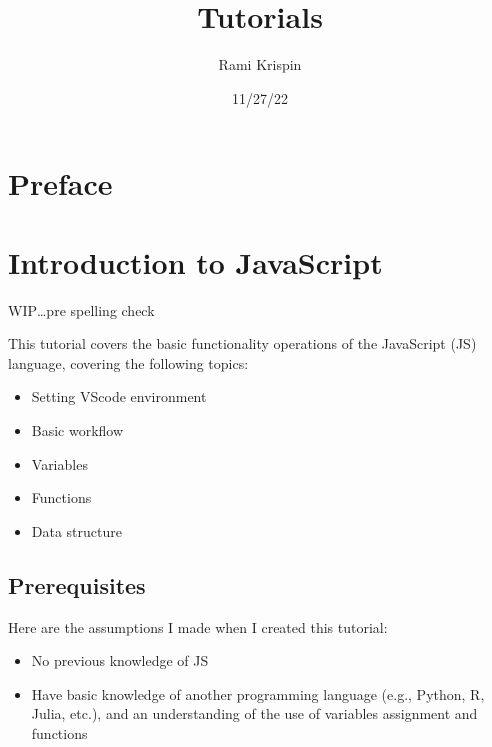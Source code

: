 \documentclass[
  letterpaper,
  DIV=11,
  numbers=noendperiod]{scrreprt}
\title{Tutorials}
\author{Rami Krispin}
\date{11/27/22}
\providecommand{\tightlist}{%
  \setlength{\itemsep}{0pt}\setlength{\parskip}{0pt}}\usepackage{longtable,booktabs,array}
\renewcommand*\contentsname{Table of contents}
\newcommand\contentsname{Table of contents}
\begin{document}
\maketitle
\ifdefined\Shaded\renewenvironment{Shaded}{\begin{tcolorbox}[boxrule=0pt, borderline west={3pt}{0pt}{shadecolor}, sharp corners, enhanced, frame hidden, interior hidden, breakable]}{\end{tcolorbox}}\fi

\renewcommand*\contentsname{Table of contents}
{
\hypersetup{linkcolor=}
\setcounter{tocdepth}{2}
\tableofcontents
}

\hypertarget{preface}{%
\chapter*{Preface}\label{preface}}



\hypertarget{introduction-to-javascript}{%
\chapter{Introduction to JavaScript}\label{introduction-to-javascript}}

WIP\ldots pre spelling check

This tutorial covers the basic functionality operations of the
JavaScript (JS) language, covering the following topics:

\begin{itemize}
\tightlist
\item
  Setting VScode environment
\item
  Basic workflow
\item
  Variables
\item
  Functions
\item
  Data structure
\end{itemize}

\hypertarget{prerequisites}{%
\section{Prerequisites}\label{prerequisites}}

Here are the assumptions I made when I created this tutorial:

\begin{itemize}
\tightlist
\item
  No previous knowledge of JS
\item
  Have basic knowledge of another programming language (e.g., Python, R,
  Julia, etc.), and an understanding of the use of variables assignment
  and functions
\end{itemize}
\end{document}
